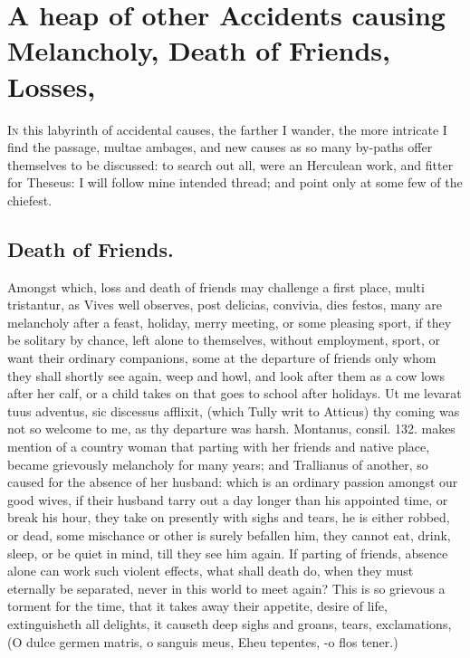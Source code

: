 {%
\section[Accidents, Death of Friends, Losses]{A heap of other Accidents causing Melancholy, Death of Friends, Losses, \etc{}}

\lettrine{I}{n} this labyrinth of accidental causes, the farther I wander, the more
intricate I find the passage, multae ambages, and new causes as so many
by-paths offer themselves to be discussed: to search out all, were an
Herculean work, and fitter for Theseus: I will follow mine intended
thread; and point only at some few of the chiefest.
\subsection{Death of Friends.}
Amongst which, loss and death of friends may
challenge a first place, multi tristantur, as Vives well
observes, post delicias, convivia, dies festos, many are melancholy
after a feast, holiday, merry meeting, or some pleasing sport, if they
be solitary by chance, left alone to themselves, without employment,
sport, or want their ordinary companions, some at the departure of
friends only whom they shall shortly see again, weep and howl, and look
after them as a cow lows after her calf, or a child takes on that goes
to school after holidays. Ut me levarat tuus adventus, sic discessus
afflixit, (which Tully writ to Atticus) thy coming was not so
welcome to me, as thy departure was harsh. Montanus, consil. 132. makes
mention of a country woman that parting with her friends and native
place, became grievously melancholy for many years; and Trallianus of
another, so caused for the absence of her husband: which is an ordinary
passion amongst our good wives, if their husband tarry out a day longer
than his appointed time, or break his hour, they take on presently with
sighs and tears, he is either robbed, or dead, some mischance or other
is surely befallen him, they cannot eat, drink, sleep, or be quiet in
mind, till they see him again. If parting of friends, absence alone can
work such violent effects, what shall death do, when they must
eternally be separated, never in this world to meet again? This is so
grievous a torment for the time, that it takes away their appetite,
desire of life, extinguisheth all delights, it causeth deep sighs and
groans, tears, exclamations,
(O dulce germen matris, o sanguis meus, Eheu tepentes, \etc{}-o flos tener.) 
}
